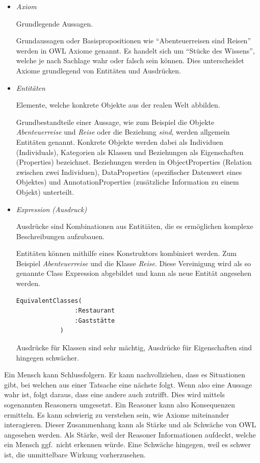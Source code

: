 \begin{itemize}
	\item \textit{Axiom}

        Grundlegende Aussagen.

        Grundaussagen  oder Basispropositionen wie ``Abenteuerreisen sind Reisen'' werden in OWL Axiome genannt. Es handelt sich  um ``Stücke des Wissens'', welche je nach Sachlage wahr oder falsch sein können. Dies unterscheidet Axiome grundlegend von Entitäten und Ausdrücken.

    \item \textit{Entitäten}

        Elemente, welche konkrete Objekte aus der realen Welt abbilden.

        Grundbestandteile einer Aussage, wie zum Beispiel die Objekte \textit{Abenteuerreise} und \textit{Reise} oder die Beziehung \textit{sind}, werden allgemein Entitäten genannt. Konkrete Objekte werden dabei als Individuen (Individuals), Kategorien als Klassen und Beziehungen als Eigenschaften (Properties) bezeichnet. Beziehungen werden in ObjectProperties (Relation zwischen zwei Individuen), DataProperties (spezifischer Datenwert eines Objektes) und AnnotationProperties (zusätzliche Information zu einem Objekt) unterteilt.

	\item \textit{Expression (Ausdruck)}

        Ausdrücke sind Kombinationen aus Entitiäten, die es ermöglichen komplexe Beschreibungen aufzubauen.

        Entitäten können mithilfe eines Konstruktors kombiniert werden. Zum Beispiel \textit{Abenteuerreise} und die Klasse \textit{Reise}. Diese Vereinigung wird als so genannte Class Expression abgebildet und kann als neue Entität angesehen werden.

        \begin{lstlisting}[caption={Beispiel eines Ausdrucks}]
            EquivalentClasses(
                :Restaurant
                :Gaststätte
            )
        \end{lstlisting}

        Ausdrücke für Klassen sind sehr mächtig, Ausdrücke für Eigenschaften sind hingegen schwächer.
\end{itemize}

Ein Mensch kann Schlussfolgern. Er kann nachvollziehen, dass es Situationen gibt, bei welchen aus einer Tatsache eine nächste folgt. Wenn also eine Aussage wahr ist, folgt daraus, dass eine andere auch zutrifft. Dies wird mittels sogenannten Reasonern umgesetzt. Ein Reasoner kann also Konsequenzen ermitteln. Es kann schwierig zu verstehen sein, wie Axiome miteinander interagieren. Dieser Zusammenhang kann als Stärke und als Schwäche von OWL angesehen werden. Als Stärke, weil der Reasoner Informationen aufdeckt, welche ein Mensch ggf.\ nicht erkennen würde. Eine Schwäche hingegen, weil es schwer ist, die unmittelbare Wirkung vorherzusehen.

